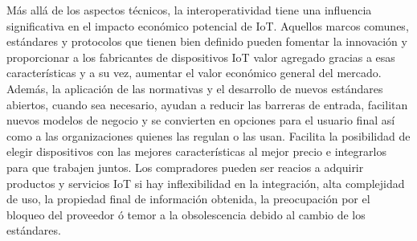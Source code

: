 Más allá de los aspectos técnicos, la interoperatividad tiene una influencia significativa en el impacto económico potencial de IoT. Aquellos marcos comunes, estándares y protocolos que tienen bien definido pueden fomentar la innovación y proporcionar a los fabricantes de dispositivos IoT valor agregado gracias a esas características y a su vez, aumentar el valor económico general del mercado.\\

Además, la aplicación de las normativas y el desarrollo de nuevos estándares abiertos, cuando sea necesario, ayudan a reducir las barreras de entrada, facilitan nuevos modelos de negocio y se convierten en opciones para el usuario final así como a las organizaciones quienes las regulan o las usan. Facilita la posibilidad de elegir dispositivos con las mejores características al mejor precio e integrarlos para que trabajen juntos. Los compradores pueden ser reacios a adquirir productos y servicios IoT si hay inflexibilidad en la integración, alta complejidad de uso, la propiedad final de información obtenida, la preocupación por el bloqueo del proveedor ó temor a la obsolescencia debido al cambio de los estándares\cite{iotInternetSociety}.

